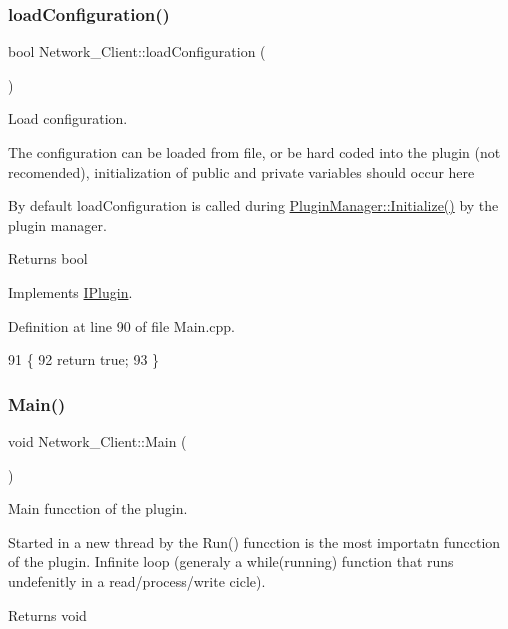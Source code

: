 \subsubsection{\texorpdfstring{load\+Configuration()}{loadConfiguration()}}
{\footnotesize\ttfamily bool Network\+\_\+\+Client\+::load\+Configuration (\begin{DoxyParamCaption}{ }\end{DoxyParamCaption})\hspace{0.3cm}{\ttfamily [virtual]}}



Load configuration. 

The configuration can be loaded from file, or be hard coded into the plugin (not recomended), initialization of public and private variables should occur here

By default load\+Configuration is called during \hyperlink{class_plugin_manager_a956e653b7db36da9d034b4a93c8308d5}{Plugin\+Manager\+::\+Initialize()} by the plugin manager.

\begin{DoxyReturn}{Returns}
bool 
\end{DoxyReturn}


Implements \hyperlink{class_i_plugin_a418cff309436d3a15d9a4ce7369db6dd}{I\+Plugin}.



Definition at line 90 of file Main.\+cpp.


\begin{DoxyCode}
91 \{
92     \textcolor{keywordflow}{return} \textcolor{keyword}{true};
93 \}
\end{DoxyCode}
\mbox{\label{class_network___client_a711e61f7233983449a1f4a50a4009b87}} 
\subsubsection{\texorpdfstring{Main()}{Main()}}
{\footnotesize\ttfamily void Network\+\_\+\+Client\+::\+Main (\begin{DoxyParamCaption}{ }\end{DoxyParamCaption})\hspace{0.3cm}{\ttfamily [virtual]}}



Main funcction of the plugin. 

Started in a new thread by the Run() funcction is the most importatn funcction of the plugin. Infinite loop (generaly a while(running) function that runs undefenitly in a read/process/write cicle). \begin{DoxyReturn}{Returns}
void 
\end{DoxyReturn}


